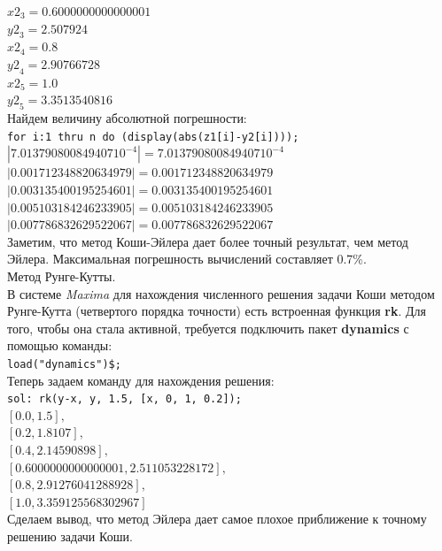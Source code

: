 \documentclass[article, bachelor, och, pract]{SCWorks}
\begin{document}
\begin{itemize}
\({{\mathit{x2}}_{3}}=0.6000000000000001\)\\
\({{\mathit{y2}}_{3}}=2.507924\)\\
\({{\mathit{x2}}_{4}}=0.8\)\\
\({{\mathit{y2}}_{4}}=2.90766728\)\\
\({{\mathit{x2}}_{5}}=1.0\)\\
\({{\mathit{y2}}_{5}}=3.3513540816\mbox{}\)\\
Найдем величину абсолютной погрешности:\\
\texttt{for i:1 thru n do (display(abs(z1[i]-y2[i])));}\\
\(\displaystyle
\left| 7.013790800849407{{10}^{-4}}\right| =7.013790800849407{{10}^{-4}}\)\\
\(\left| 0.001712348820634979\right| =0.001712348820634979\)\\
\(\left| 0.003135400195254601\right| =0.003135400195254601\)\\
\(\left| 0.005103184246233905\right| =0.005103184246233905\)\\
\(\left| 0.007786832629522067\right| =0.007786832629522067\mbox{}\)\\
Заметим, что метод Коши-Эйлера дает более точный результат, чем метод Эйлера. Максимальная погрешность вычислений составляет 0.7\%.\\

Метод Рунге-Кутты.\\
В системе \emph{Maxima} для нахождения численного решения задачи Коши методом Рунге-Кутта (четвертого порядка точности) есть встроенная функция \textbf{rk}. Для того, чтобы она стала активной, требуется подключить пакет \textbf{dynamics} с помощью команды:\\
\texttt{load("dynamics")\$;}\\
Теперь задаем команду для нахождения решения:\\
\texttt{sol: rk(y-x, y, 1.5, [x, 0, 1, 0.2]);}\\
\([0.0,1.5],\)\\
\([0.2,1.8107],\)\\
\([0.4,2.14590898],\)\\
\([0.6000000000000001,2.511053228172],\)\\
\([0.8,2.91276041288928],\)\\
\([1.0,3.359125568302967]\mbox{}
\)\\
Сделаем вывод, что метод Эйлера дает самое плохое приближение к точному решению задачи Коши.\\


\end{itemize}
\end{document}
